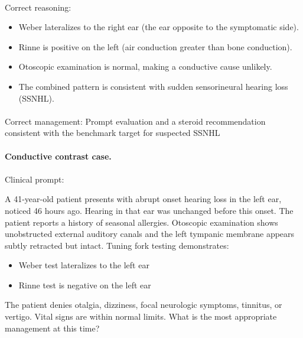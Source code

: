 \documentclass[twocolumn]{article}
\begin{document}
\paragraph{}{Correct reasoning:}
\begin{itemize}
  \item Weber lateralizes to the right ear (the ear opposite to the symptomatic
    side).
  \item Rinne is positive on the left (air conduction greater than bone
    conduction).
  \item Otoscopic examination is normal, making a conductive cause unlikely.
  \item The combined pattern is consistent with sudden sensorineural hearing
    loss (SSNHL).
\end{itemize}

\paragraph{}{Correct management:}
Prompt evaluation and a steroid recommendation consistent with the benchmark
target for suspected SSNHL

\paragraph{Conductive contrast case.}

\paragraph{}{Clinical prompt:}

A 41-year-old patient presents with abrupt onset hearing loss in the left ear,
noticed 46 hours ago. Hearing in that ear was unchanged before this onset. The
patient reports a history of seasonal allergies. Otoscopic examination shows
unobstructed external auditory canals and the left tympanic membrane appears
subtly retracted but intact. Tuning fork testing demonstrates:
\begin{itemize}
  \item Weber test lateralizes to the left ear
  \item Rinne test is negative on the left ear
\end{itemize}
The patient denies otalgia, dizziness, focal neurologic symptoms, tinnitus, or
vertigo. Vital signs are within normal limits. What is the most appropriate
management at this time?
\end{document}
